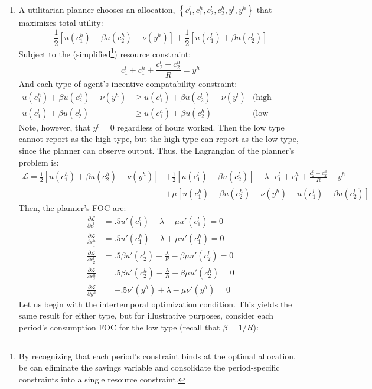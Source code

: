 \documentclass{article}
\renewcommand{\L}{\mathcal{L}}
\begin{document}
\begin{enumerate}
	\item A utilitarian planner chooses an allocation, ${\left\{c_1^l,c_1^h,c_2^l,c_2^h,y^l,y^h\right\}}$ that maximizes total utility:
		\[
			\frac{1}{2}\left[u(c_1^h) + \beta u(c_2^h) - \nu(y^h)\right] + \frac{1}{2}\left[u(c_1^l) + \beta u(c_2^l)\right]
		\]
		Subject to the (simplified\footnote{By recognizing that each period's constraint binds at the optimal allocation, be can eliminate the savings variable and consolidate the period-specific constraints into a single resource constraint.}) resource constraint:
		\[
			c_1^l + c_1^h + \frac{c_2^l + c_2^h}{R} = y^h
		\]
		And each type of agent's incentive compatability constraint:
		\begin{align*}
			u(c_1^h) + \beta u(c_2^h) - \nu(y^h)	&\geq u(c_1^l) + \beta u(c_2^l) - \nu(y^l)	&\text{(high-productivity IC)}	\\
						u(c_1^l) + \beta u(c_2^l)	&\geq u(c_1^h) + \beta u(c_2^h)				&\text{(low-productivity IC)}
		\end{align*}
		Note, however, that ${y^l=0}$ regardless of hours worked. Then the low type cannot report as the high type, but the high type can report as the low type, since the planner can observe output. Thus, the Lagrangian of the planner's problem is:
		{\small \begin{align*}
			\L = \frac{1}{2}\left[u(c_1^h) + \beta u(c_2^h) - \nu(y^h)\right] &+ \frac{1}{2}\left[u(c_1^l) + \beta u(c_2^l)\right] 	
					- \lambda\left[c_1^l + c_1^h + \frac{c_2^l + c_2^h}{R} - y^h\right]											\\
					&+ \mu\left[u(c_1^h) + \beta u(c_2^h) - \nu(y^h)	- u(c_1^l) - \beta u(c_2^l)\right]
		\end{align*} }
		Then, the planner's FOC are:
		\begin{align*}
			\frac{\partial\L}{\partial c_1^l} 	&=  .5u'(c_1^l) - \lambda - \mu u'(c_1^l)	= 0							\\
			\frac{\partial\L}{\partial c_1^h} 	&= 	.5u'(c_1^h) - \lambda + \mu u'(c_1^h)	= 0							\\
			\frac{\partial\L}{\partial c_2^l} 	&= 	.5\beta u'(c_2^l) - \frac{\lambda}{R} - \beta\mu u'(c_2^l) = 0	\\
			\frac{\partial\L}{\partial c_2^h} 	&= 	.5\beta u'(c_2^h) - \frac{\lambda}{R} + \beta\mu u'(c_2^h) = 0	\\
			\frac{\partial\L}{\partial y^h} 	&= -.5\nu'(y^h) + \lambda -\mu\nu'(y^h)		= 0	
		\end{align*}
		Let us begin with the intertemporal optimization condition. This yields the same result for either type, but for illustrative purposes, consider each period's consumption FOC for the low type (recall that ${\beta=1/R}$):

\end{enumerate}
\end{document}
